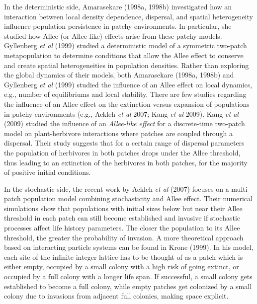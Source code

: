 \indent In the deterministic side, Amarasekare (1998a, 1998b) investigated how an interaction between local density dependence,
 dispersal, and spatial heterogeneity influence population persistence in patchy environments.
 In particular, she studied how Allee (or Allee-like) effects arise from these patchy models.
 Gyllenberg \emph{et al} (1999) studied a deterministic model of a symmetric two-patch metapopulation to determine conditions that
 allow the Allee effect to conserve and create spatial heterogeneities in population densities.
 Rather than exploring the global dynamics of their models, both Amarasekare (1998a, 1998b) and Gyllenberg \emph{et al} (1999)
 studied the influence of an Allee effect on local dynamics, e.g., number of equilibriums and local stability.
 There are few studies regarding the influence of an Allee effect on the extinction versus expansion of populations in patchy
 environments (e.g., Ackleh \emph{et al} 2007; Kang \emph{et al} 2009).
 Kang \emph{et al} (2009) studied the influence of an \emph{Allee-like effect} for a discrete-time two-patch model on
 plant-herbivore interactions where patches are coupled through a dispersal.
 Their study suggests that for a certain range of dispersal parameters the population of herbivores in both patches drops under
 the Allee threshold, thus leading to an extinction of the herbivores in both patches, for the majority of positive initial
 conditions.

\indent In the stochastic side, the recent work by Ackleh \emph{et al} (2007) focuses on a multi-patch population model
 combining stochasticity and Allee effect.
 Their numerical simulations show that populations with initial sizes below but near their Allee threshold in each patch
 can still become established and invasive if stochastic processes affect life history parameters.
 The closer the population to its Allee threshold, the greater the probability of invasion.
 A more theoretical approach based on interacting particle systems can be found in Krone (1999).
 In his model, each site of the infinite integer lattice has to be thought of as a patch which is either empty, occupied by a
 small colony with a high risk of going extinct, or occupied by a full colony with a longer life span.
 If successful, a small colony gets established to become a full colony, while empty patches get colonized by a small colony
 due to invasions from adjacent full colonies, making space explicit.

